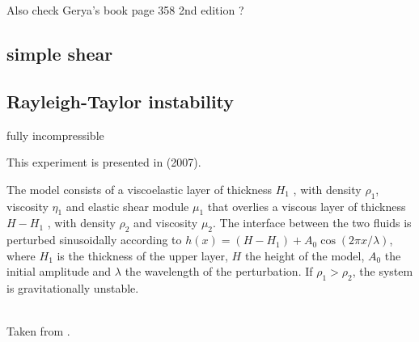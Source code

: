 Also check Gerya's book page 358 2nd edition ?






\subsection{simple shear}

\subsection{Rayleigh-Taylor instability}

{\color{orange} fully incompressible}

This experiment is presented in \textcite{kabe07} (2007).

The model consists of a viscoelastic layer of thickness $H_1$ , with density $\rho_1$, 
viscosity $\eta_1$ and elastic shear module $\mu_1$ that overlies a viscous
layer of thickness $H-H_1$ , with density $\rho_2$ and viscosity $\mu_2$. 
The interface between the two fluids is perturbed sinusoidally according
to $h(x) = (H - H_1 ) + A_0 \cos (2\pi x/ \lambda )$, 
where $H_1$ is the thickness of the upper layer, $H$ the height of the model, 
$A_0$ the initial amplitude and $\lambda$ the wavelength of the perturbation. 
If $\rho_1>\rho_2$, the system is gravitationally unstable.

\begin{center}
\\
{\captionfont Taken from \textcite{kabe07}.}
\end{center}

